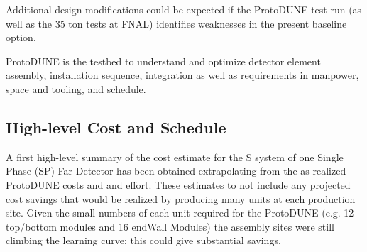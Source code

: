 Additional design modifications could be expected if the ProtoDUNE test run (as well as the 35 ton tests at FNAL) identifies weaknesses in the present baseline option.


ProtoDUNE is the testbed to understand and optimize detector element assembly, installation sequence, integration as well as requirements in manpower, space and tooling, and schedule. 



%
%
%
\subsection{High-level Cost and Schedule}
\label{sec:fdsp-hv-org-cs}

A first high-level summary of the cost estimate for the S system of one Single Phase (SP) Far Detector has been obtained extrapolating from the as-realized ProtoDUNE costs and and effort. These estimates to not include any projected cost savings that would be realized by producing many units at each production site. Given the small numbers of each unit required for the ProtoDUNE (e.g. 12 top/bottom modules and 16 endWall Modules) the assembly sites were still climbing the learning curve; this could give substantial savings. 

